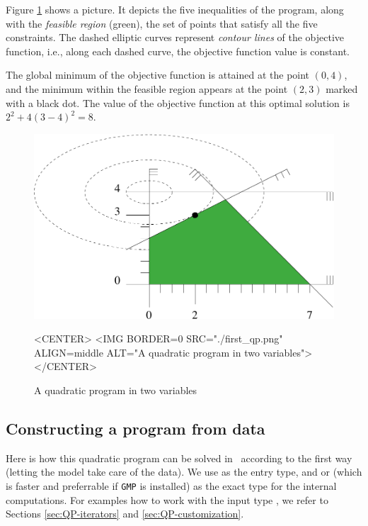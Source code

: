 Figure \ref{fig:QP-first_qp} shows a picture. It
depicts the five inequalities of the program, along with the
\emph{feasible region} (green), the set of points that satisfy all the
five constraints. The dashed elliptic curves represent \emph{contour lines} 
of the objective function, i.e., along each dashed curve, the objective
function value is constant. 

The global minimum of the objective function is attained at 
the point $(0,4)$, and the minimum within the feasible region appears
at the point $(2,3)$ marked with a black dot. The value of the objective
function at this optimal solution is $2^2 + 4(3-4)^2 = 8$.

\begin{figure}[htbp]
\begin{ccTexOnly}
\begin{center}
\includegraphics{QP_solver/first_qp} %
\end{center}
\end{ccTexOnly}

\begin{ccHtmlOnly}
<CENTER>
<IMG BORDER=0 SRC="./first_qp.png" ALIGN=middle ALT="A quadratic program in two variables">
</CENTER>
\end{ccHtmlOnly}

\caption{A quadratic program in two variables
\label{fig:QP-first_qp}}
\end{figure}

\subsection{Constructing a program from data}
Here is how this quadratic program can be solved in \cgal\ 
according to the first way (letting the model take care of
the data). We use  as the entry type, and 
 or  (which is faster and preferrable if
\texttt{GMP} is installed) as the exact type for the
internal computations. For examples 
how to work with the input type , we refer to 
Sections \ref{sec:QP-iterators} and \ref{sec:QP-customization}.

